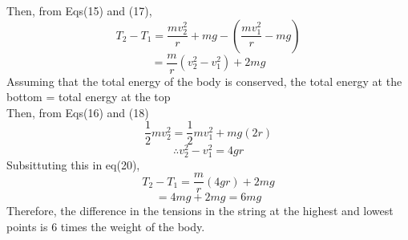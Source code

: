 \documentclass{article}
\begin{document}
   Then, from Eqs(15) and (17),
   \begin{equation}
	   T_2 - T_1 = \frac{mv_2^2}{r} + mg - (\frac{mv_1^2}
	   {r} - mg)
   \end{equation}
   \begin{equation}
	   = \frac{m}{r} (v_2^2 - v_1^2) + 2mg
   \end{equation}
   Assuming that the total energy of the body is conserved,
   the total energy at the bottom = total energy at the top \\
   Then, from Eqs(16) and (18)
   \begin{equation}
	   \frac{1}{2}mv_2^2 = \frac{1}{2}mv_1^2 + mg(2r)
   \end{equation}
   \begin{equation}
   	\therefore v_2^2 - v_1^2 = 4gr
   \end{equation}
   Subsittuting this in eq(20),
   \begin{equation}
	   T_2 - T_1 = \frac{m}{r}(4gr) + 2mg
   \end{equation}
   \begin{equation}
   	= 4mg + 2mg = 6mg
   \end{equation}
   Therefore, the difference in the tensions in the string at
   the highest and lowest points is 6 times the weight of the
   body.
\end{document}
